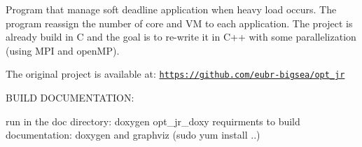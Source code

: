 Program that manage soft deadline application when heavy load occurs. The program reassign the number of core and V\-M to each application. The project is already build in C and the goal is to re-\/write it in C++ with some parallelization (using M\-P\-I and open\-M\-P).

The original project is available at\-: \href{https://github.com/eubr-bigsea/opt_jr}{\tt https\-://github.\-com/eubr-\/bigsea/opt\-\_\-jr}

B\-U\-I\-L\-D D\-O\-C\-U\-M\-E\-N\-T\-A\-T\-I\-O\-N\-:

run in the doc directory\-: doxygen opt\-\_\-jr\-\_\-doxy requirments to build documentation\-: doxygen and graphviz (sudo yum install ..) 